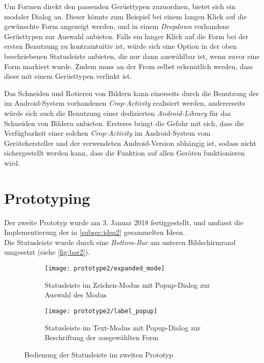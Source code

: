 Um Formen direkt den passenden Gerüsttypen zuzuordnen, bietet sich ein modaler Dialog an.
Dieser könnte zum Beispiel bei einem langen Klick auf die gewünschte Form angezeigt werden, und in einem \emph{Dropdown} vorhandene Gerüsttypen zur Auswahl anbieten.
Falls ein langer Klick auf die Form bei der ersten Benutzung zu kontraintuitiv ist, würde sich eine Option in der oben beschriebenen Statusleiste anbieten, die nur dann auswählbar ist, wenn zuvor eine Form markiert wurde.
Zudem muss an der From selbst erkenntlich werden, dass diese mit einem Gerüsttypen verlinkt ist. \\

Das Schneiden und Rotieren von Bildern kann einerseits durch die Benutzung der im Android-System vorhandenen \emph{Crop-Activity} realisiert werden, andererseits würde sich auch die Benutzung einer dedizierten \emph{Android-Library} für das Schneiden von Bildern anbieten.
Ersteres bringt die Gefahr mit sich, dass die Verfügbarkeit einer solchen \emph{Crop-Activity} im Android-System vom Gerätehersteller und der verwendeten Android-Version abhängig ist, sodass nicht sichergestellt werden kann, dass die Funktion auf allen Geräten funktionieren wird. \\

\section{Prototyping}

Der zweite Prototyp wurde am 3. Januar 2018 fertiggestellt, und umfasst die Implementierung der in \autoref{subsec:idea2} gesammelten Ideen. \\

Die Statusleiste wurde durch eine \emph{Bottom-Bar} am unteren Bildschirmrand umgesetzt (siehe \autoref{fig:bar2}).

\begin{figure}[ht]
  \begin{subfigure}[t]{0.4\textwidth}
    \texttt{[image: prototype2/expanded\_mode]}
    \caption{Statusleiste im Zeichen-Modus mit Popup-Dialog zur Auswahl des Modus}
    \label{fig:mode2}
  \end{subfigure}
  \begin{subfigure}[t]{0.4\textwidth}
    \texttt{[image: prototype2/label\_popup]}
    \caption{Statusleiste im Text-Modus mit Popup-Dialog zur Beschriftung der ausgewählten Form}
    \label{fig:labelp2}
  \end{subfigure}
  \centering
  \caption{Bedienung der Statusleiste im zweiten Prototyp}
  \label{fig:bar2}
\end{figure}

